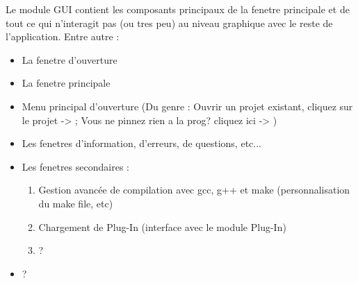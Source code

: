 \documentclass[a4paper,12pt]{article}
\begin{document}
Le module GUI contient les composants principaux de la fenetre principale et de tout ce qui n'interagit pas (ou tres peu) au niveau graphique avec le reste de l'application.
Entre autre :
\begin{itemize}
\item La fenetre d'ouverture
\item La fenetre principale
\item Menu principal d'ouverture (Du genre : Ouvrir un projet existant, cliquez sur le projet -> ; Vous ne pinnez rien a la prog? cliquez ici -> )
\item Les fenetres d'information, d'erreurs, de questions, etc...
\item Les fenetres secondaires :
\begin{enumerate}
\item Gestion avancée de compilation avec gcc, g++ et make (personnalisation du make file, etc)
\item Chargement de Plug-In (interface avec le module Plug-In)
\item ?
\end{enumerate}
\item ?
\end{itemize}
\end{document}
